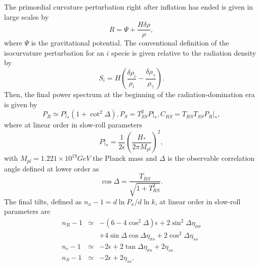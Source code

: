 \documentclass[amssymb,twocolumn,prd,nofootinbib,showpacs]{revtex4-1}
\begin{document}
The primordial curvature perturbation right after inflation has ended is given in large scales by
\begin{equation}
R=\Psi+\frac{H\delta\rho}{\rho},
\end{equation}
where $\Psi$ is the gravitational potential. The conventional definition of the isocurvature perturbation for an $i$ specie is given relative to the radiation density by
\begin{equation}
S_i=H\left(\frac{\delta\rho_{i}}{\rho_{i}}-\frac{\delta\rho_\gamma}{\rho_\gamma}\right).
\end{equation}
Then, the final power spectrum at the beginning of the radiation-domination era is given by
\begin{subequations}\label{spectrums}
\begin{equation}\label{PRf}
P_R\simeq P|_*(1+\cot^2\Delta),
\end{equation}
\begin{equation}\label{isosecond}
P_S=T^2_{SS}P|_*,
\end{equation}
\begin{equation}
C_{RS}=T_{RS}T_{SS}P_R|_*,
\end{equation}
\end{subequations}
where at linear order in slow-roll parameters
\begin{equation}
P|_*=\frac{1}{2\epsilon}\left(\frac{H_*}{2\pi M_{pl}}\right)^2,
\end{equation}
with $M_{pl}=1.221\times 10^{19}GeV$ the Planck mass and $\Delta$ is the observable correlation angle defined at lower order as
\begin{equation}
\cos\Delta =\frac{T_{RS}}{\sqrt{1+T_{RS}^2}}.
\end{equation}
The final tilts, defined as $n_x-1=d\ln P_x/d\ln k$, at linear order in slow-roll parameters are
\begin{subequations}\label{tilts}
\begin{eqnarray}
n_R-1&\simeq & -(6-4\cos^2\Delta)\epsilon+2\sin^2\Delta\eta_{\sigma\sigma}\nonumber \\ &&+4\sin\Delta\cos\Delta\eta_{\sigma s}+2\cos^2\Delta\eta_{ss}\\
n_c-1&\simeq &-2\epsilon+2\tan\Delta\eta_{\sigma s}+2\eta_{ss}\\
n_S-1&\simeq & -2\epsilon+2\eta_{ss}.
\end{eqnarray}
\end{subequations}
\end{document}
